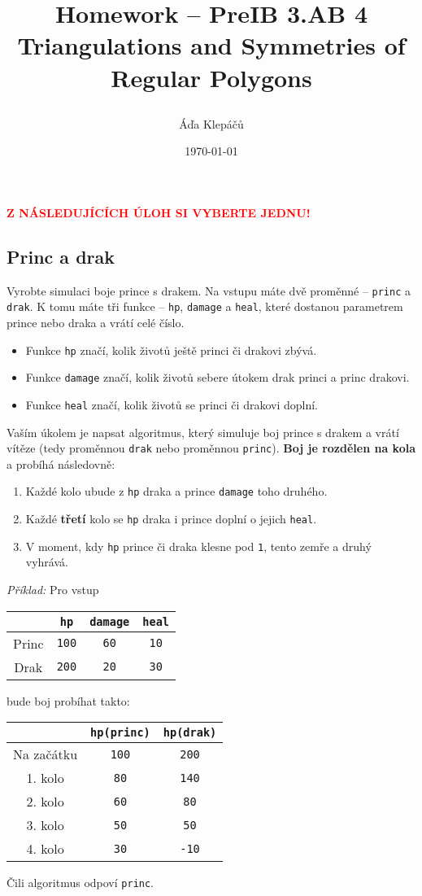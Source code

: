 \documentclass[a4paper,11pt]{article}
\title{\Huge\textsf{Homework -- PreIB 3.AB 4}\\
 \Large\textsf{Triangulations and Symmetries of Regular Polygons}
 \author{Áďa Klepáčů}
 \date{\today}
}
\newcommand{\clr}{\textcolor{red}}
\begin{document}
\thispagestyle{fancy}

\clr{\textbf{\uppercase{Z následujících úloh si vyberte jednu!}}}


\subsection*{Princ a drak}

Vyrobte simulaci boje prince s drakem. Na vstupu máte dvě proměnné --
\texttt{princ} a \texttt{drak}. K tomu máte tři funkce -- \texttt{hp},
\texttt{damage} a \texttt{heal}, které dostanou parametrem prince nebo draka a
vrátí celé číslo.
\begin{itemize}
 \item Funkce \texttt{hp} značí, kolik životů ještě princi či drakovi zbývá.
 \item Funkce \texttt{damage} značí, kolik životů sebere útokem drak princi a
  princ drakovi.
 \item Funkce \texttt{heal} značí, kolik životů se princi či drakovi doplní.
\end{itemize}

Vaším úkolem je napsat algoritmus, který simuluje boj prince s drakem a vrátí
vítěze (tedy proměnnou \texttt{drak} nebo proměnnou \texttt{princ}). \textbf{Boj
je rozdělen na kola} a probíhá následovně:
\begin{enumerate}
 \item Každé kolo ubude z \texttt{hp} draka a prince \texttt{damage} toho
  druhého.
 \item Každé \textbf{třetí} kolo se \texttt{hp} draka i prince doplní o jejich
  \texttt{heal}.
 \item V moment, kdy \texttt{hp} prince či draka klesne pod \texttt{1}, tento
  zemře a druhý vyhrává.
\end{enumerate}

\emph{Příklad:} Pro vstup
\begin{center}
 \begin{tabular}{cccc}
  & \texttt{hp} & \texttt{damage} & \texttt{heal}\\
  \toprule
  Princ & \texttt{100} & \texttt{60} & \texttt{10}\\
  \midrule
  Drak & \texttt{200} & \texttt{20} & \texttt{30}\\
 \end{tabular}
\end{center}
bude boj probíhat takto:
\begin{center}
 \begin{tabular}{ccc}
  & \texttt{hp(princ)} & \texttt{hp(drak)} \\
  \toprule
  Na začátku & \texttt{100} & \texttt{200}\\
  \midrule
  1. kolo & \texttt{80} & \texttt{140}\\
  \midrule
  2. kolo & \texttt{60} & \texttt{80}\\
  \midrule
  3. kolo & \texttt{50} & \texttt{50}\\
  \midrule
  4. kolo & \texttt{30} & \texttt{-10}
 \end{tabular}
\end{center}
Čili algoritmus odpoví \texttt{princ}.
\end{document}

